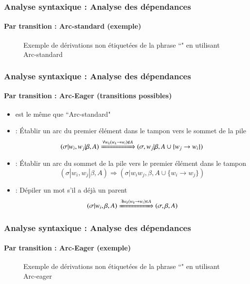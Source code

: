 \documentclass[xcolor=table]{beamer}
\begin{document}
\begin{frame}
\frametitle{Analyse syntaxique : Analyse des dépendances}
\framesubtitle{Par transition : Arc-standard (exemple)}

\begin{figure}
	\caption{Exemple de dérivations non étiquetées de la phrase ``" en utilisant Arc-standard \cite{2018-eisenstein}}
\end{figure}

\end{frame}


\begin{frame}
\frametitle{Analyse syntaxique : Analyse des dépendances}
\framesubtitle{Par transition : Arc-Eager (transitions possibles)}

\begin{itemize}
	\item {} est le même que ``Arc-standard"
	
	\item {} : Établir un arc du premier élément dans le tampon vers le sommet de la pile
	\[ (\sigma|w_i, w_j|\beta, A) \xRightarrow{\forall w_k (w_k \rightarrow w_i) \notin A}  (\sigma, w_j|\beta, A \cup \{w_j \rightarrow w_i \}) \] 
	
	\item {} : Établir un arc du sommet de la pile vers le premier élément dans le tampon
	\[ (\sigma|w_i, w_j|\beta, A) \Rightarrow  (\sigma|w_i w_j, \beta, A \cup \{w_i \rightarrow w_j \}) \] 
	
	\item {} : Dépiler un mot s'il a déjà un parent
	\[ (\sigma|w_i, \beta, A) \xRightarrow{\exists w_k (w_k \rightarrow w_i) \in A} (\sigma, \beta, A) \] 
\end{itemize}

\end{frame}

\begin{frame}
\frametitle{Analyse syntaxique : Analyse des dépendances}
\framesubtitle{Par transition : Arc-Eager (exemple)}

\begin{figure}
	\caption{Exemple de dérivations non étiquetées de la phrase ``" en utilisant Arc-eager \cite{2018-eisenstein}}
\end{figure}

\end{frame}
\end{document}
